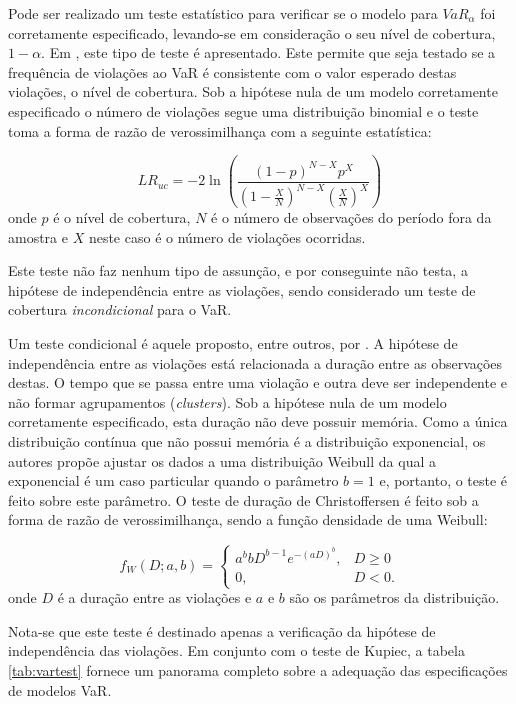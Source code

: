 \documentclass[review]{elsarticle}
\theoremstyle{definition}
\begin{document}
Pode ser realizado um teste estatístico para verificar se o modelo para $VaR_\alpha$ foi corretamente especificado, levando-se em consideração o seu nível de cobertura, $1-\alpha$. Em \cite{Kupiec1995}, este tipo de teste é apresentado. Este permite que seja testado se a frequência de violações ao VaR é consistente com o valor esperado destas violações, o nível de cobertura. Sob a hipótese nula de um modelo corretamente especificado o número de violações segue uma distribuição binomial e o teste toma a forma de razão de verossimilhança com a seguinte estatística:

\begin{equation}
	LR_{uc}=-2\ln\left(\frac{(1-p)^{N-X}p^X}{(1-\frac{X}{N})^{N-X}(\frac{X}{N})^X}\right)
\end{equation}
onde $p$ é o nível de cobertura, $N$ é o número de observações do período fora da amostra e $X$ neste caso é o número de violações ocorridas.

Este teste não faz nenhum tipo de assunção, e por conseguinte não testa, a hipótese de independência entre as violações, sendo considerado um teste de cobertura \emph{incondicional} para o VaR.

Um teste condicional é aquele proposto, entre outros, por \cite{Christoffersen2004}. A hipótese de independência entre as violações está relacionada a duração entre as observações destas. O tempo que se passa entre uma violação e outra deve ser independente e não formar agrupamentos (\emph{clusters}). Sob a hipótese nula de um modelo corretamente especificado, esta duração não deve possuir memória. Como a única distribuição contínua que não possui memória é a distribuição exponencial, os autores propõe ajustar os dados a uma distribuição Weibull da qual a exponencial é um caso particular quando o parâmetro $b=1$ e, portanto, o teste é feito sobre este parâmetro. O teste de duração de Christoffersen é feito sob a forma de razão de verossimilhança, sendo a função densidade de uma Weibull:

\begin{equation}
	f_W(D; a, b) = \begin{cases}
	a^b b D^{b-1}e^{-(aD)^b}, &D \geq 0\\
	0,&D<0.
	\end{cases} 
\end{equation}
onde $D$ é a duração entre as violações e $a$ e $b$ são os parâmetros da distribuição.

Nota-se que este teste é destinado apenas a verificação da hipótese de independência das violações. Em conjunto com o teste de Kupiec, a tabela \ref{tab:vartest} fornece um panorama completo sobre a adequação das especificações de modelos VaR.
\end{document}
